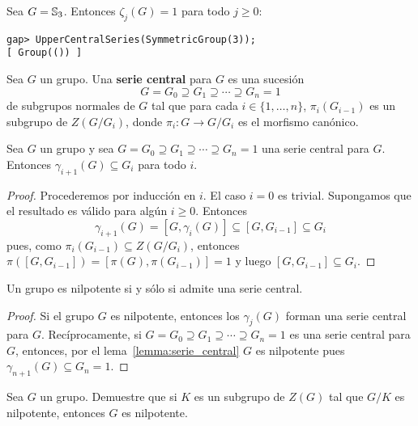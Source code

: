 \begin{example}
	Sea $G=\mathbb{S}_3$. Entonces $\zeta_j(G)=1$ para todo $j\geq 0$: 
	\begin{lstlisting}
gap> UpperCentralSeries(SymmetricGroup(3));
[ Group(()) ]
	\end{lstlisting}
\end{example}

\begin{definition}
	Sea $G$ un grupo. Una \textbf{serie central} para $G$ es una sucesión 
	\[
		G=G_0\supseteq G_1\supseteq\cdots\supseteq G_n=1
	\]
	de subgrupos normales de $G$ tal que para cada $i\in\{1,\dots,n\}$, 
	$\pi_i(G_{i-1})$ es un subgrupo de $Z(G/G_i)$, donde $\pi_i\colon G\to
	G/G_i$ es el morfismo canónico.
\end{definition}

\begin{lemma}
	\label{lemma:serie_central}
	Sea $G$ un grupo y sea $G=G_0\supseteq G_1\supseteq\cdots\supseteq G_n=1$
	una serie central para $G$. Entonces $\gamma_{i+1}(G)\subseteq G_i$ para
	todo $i$.
\end{lemma}

\begin{proof}
	Procederemos por inducción en $i$. El caso $i=0$ es trivial.  Supongamos
	que el resultado es válido para algún $i\geq0$. Entonces 
	\[
	\gamma_{i+1}(G)=[G,\gamma_i(G)]\subseteq [G,G_{i-1}]\subseteq G_i
	\]
	pues, como $\pi_i(G_{i-1})\subseteq Z(G/G_{i})$, entonces
	$\pi([G,G_{i-1}])=[\pi(G),\pi(G_{i-1})]=1$ y luego $[G,G_{i-1}]\subseteq
	G_i$.
\end{proof}


\begin{theorem}
	Un grupo es nilpotente si y sólo si admite una serie central.
\end{theorem}

\begin{proof}
	Si el grupo $G$ es nilpotente, entonces los $\gamma_j(G)$ forman una serie
	central para $G$. Recíprocamente, si $G=G_0\supseteq
	G_1\supseteq\cdots\supseteq G_n=1$ es una serie central para $G$, entonces,
	por el lema~\ref{lemma:serie_central} $G$ es nilpotente pues
	$\gamma_{n+1}(G)\subseteq G_n=1$.
\end{proof}

\begin{exercise}
	Sea $G$ un grupo. Demuestre que si $K$ es un subgrupo de $Z(G)$ tal que
	$G/K$ es nilpotente, entonces $G$ es nilpotente.
\end{exercise}

